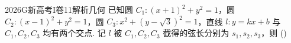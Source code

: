 
\begin{problem}{2026}{G}{新高考I卷}{11}{解析几何}
已知圆 $ C_1:(x+1)^2+y^2=1 $，圆 $ C_2:(x-1)^2+y^2=1 $，圆 $ C_3:x^2+(y-\sqrt{3})^2=1 $，直线 $ l:y=kx+b $ 与 $ C_1,C_2,C_3 $ 均有两个交点. 记 $ l $ 被 $ C_1,C_2,C_3 $ 截得的弦长分别为 $ s_1,s_2,s_3 $，则 (\hspace{1cm})
\begin{choices}
\end{choices}
\end{problem}

\begin{answer}
\end{answer}

\begin{solutions}
\end{solutions}